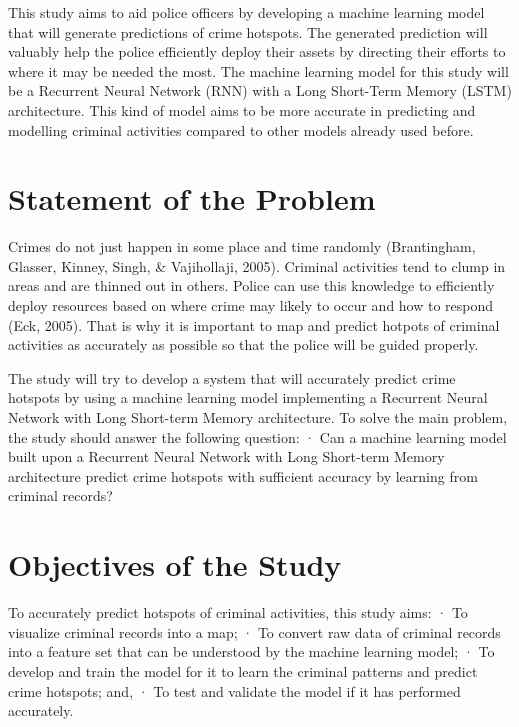     This study aims to aid police officers by developing a machine learning model that will generate predictions of crime hotspots. The generated prediction will valuably help the police efficiently deploy their assets by directing their efforts to where it may be needed the most. The machine learning model for this study will be a Recurrent Neural Network (RNN) with a Long Short-Term Memory (LSTM) architecture. This kind of model aims to be more accurate in predicting and modelling criminal activities compared to other models already used before.

\section{Statement of the Problem} %

    Crimes do not just happen in some place and time randomly (Brantingham, Glasser, Kinney, Singh, & Vajihollaji, 2005). Criminal activities tend to clump in areas and are thinned out in others. Police can use this knowledge to efficiently deploy resources based on where crime may likely to occur and how to respond (Eck, 2005). That is why it is important to map and predict hotpots of criminal activities as accurately as possible so that the police will be guided properly.

    The study will try to develop a system that will accurately predict crime hotspots by using a machine learning model implementing a Recurrent Neural Network with Long Short-term Memory architecture. To solve the main problem, the study should answer the following question:
        ·  Can a machine learning model built upon a Recurrent Neural Network with Long Short-term Memory architecture predict crime hotspots with sufficient accuracy by learning from criminal records?

\section{Objectives of the Study} %

To accurately predict hotspots of criminal activities, this study aims:
·         To visualize criminal records into a map;
·         To convert raw data of criminal records into a feature set that can be understood by the machine learning model;
·         To develop and train the model for it to learn the criminal patterns and predict crime hotspots; and,
·         To test and validate the model if it has performed accurately.

